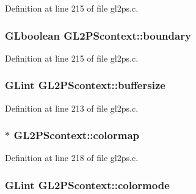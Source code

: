 Definition at line 215 of file gl2ps.\+c.

\hypertarget{struct_g_l2_p_scontext_a2c693b811a62921dd6bb517cc134fece}{}
\subsubsection[{boundary}]{\setlength{\rightskip}{0pt plus 5cm}G\+Lboolean G\+L2\+P\+Scontext\+::boundary}\label{struct_g_l2_p_scontext_a2c693b811a62921dd6bb517cc134fece}


Definition at line 215 of file gl2ps.\+c.

\hypertarget{struct_g_l2_p_scontext_add11b55efa212e2ef663eead00d191ee}{}
\subsubsection[{buffersize}]{\setlength{\rightskip}{0pt plus 5cm}G\+Lint G\+L2\+P\+Scontext\+::buffersize}\label{struct_g_l2_p_scontext_add11b55efa212e2ef663eead00d191ee}


Definition at line 213 of file gl2ps.\+c.

\hypertarget{struct_g_l2_p_scontext_ac2513a40f5f94351efff9b30afab5a73}{}
\subsubsection[{colormap}]{$\ast$ G\+L2\+P\+Scontext\+::colormap}\label{struct_g_l2_p_scontext_ac2513a40f5f94351efff9b30afab5a73}


Definition at line 218 of file gl2ps.\+c.

\hypertarget{struct_g_l2_p_scontext_a6bf2136e8b60459d996ee187c9268ddb}{}
\subsubsection[{colormode}]{\setlength{\rightskip}{0pt plus 5cm}G\+Lint G\+L2\+P\+Scontext\+::colormode}\label{struct_g_l2_p_scontext_a6bf2136e8b60459d996ee187c9268ddb}


